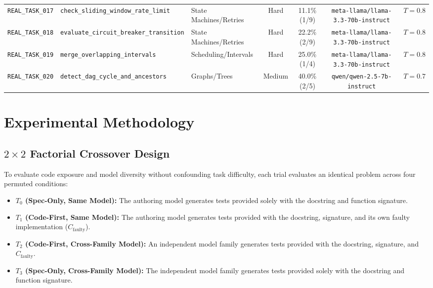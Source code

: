 \documentclass[11pt,a4paper]{article}
\begin{document}
\begin{table}[t]
{\begin{tabular}{lllcccc}
\texttt{REAL\_TASK\_017} & \texttt{check\_sliding\_window\_rate\_limit} & State Machines/Retries & Hard & 11.1\% (1/9) & \texttt{meta-llama/llama-3.3-70b-instruct} & $T=0.8$ \\
\texttt{REAL\_TASK\_018} & \texttt{evaluate\_circuit\_breaker\_transition} & State Machines/Retries & Hard & 22.2\% (2/9) & \texttt{meta-llama/llama-3.3-70b-instruct} & $T=0.8$ \\
\texttt{REAL\_TASK\_019} & \texttt{merge\_overlapping\_intervals} & Scheduling/Intervals & Hard & 25.0\% (1/4) & \texttt{meta-llama/llama-3.3-70b-instruct} & $T=0.8$ \\
\texttt{REAL\_TASK\_020} & \texttt{detect\_dag\_cycle\_and\_ancestors} & Graphs/Trees & Medium & 40.0\% (2/5) & \texttt{qwen/qwen-2.5-7b-instruct} & $T=0.7$ \\
\bottomrule
\end{tabular}%
}
\end{table}

\section{Experimental Methodology}
\label{sec:methodology}

\subsection{\texorpdfstring{$2 \times 2$}{2x2} Factorial Crossover Design}
To evaluate code exposure and model diversity without confounding task difficulty, each trial evaluates an identical problem across four permuted conditions:
\begin{itemize}
    \item \textbf{$T_0$ (Spec-Only, Same Model):} The authoring model generates tests provided solely with the docstring and function signature.
    \item \textbf{$T_1$ (Code-First, Same Model):} The authoring model generates tests provided with the docstring, signature, and its own faulty implementation ($C_{\text{faulty}}$).
    \item \textbf{$T_2$ (Code-First, Cross-Family Model):} An independent model family generates tests provided with the docstring, signature, and $C_{\text{faulty}}$.
    \item \textbf{$T_3$ (Spec-Only, Cross-Family Model):} The independent model family generates tests provided solely with the docstring and function signature.
\end{itemize}
\end{document}

